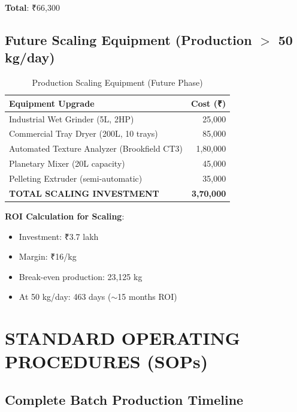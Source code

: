 \documentclass[12pt,a4paper]{article}
\begin{document}
\textbf{Total}: ₹66,300

\subsection{Future Scaling Equipment (Production $>$ 50 kg/day)}

\begin{table}[h]
\centering
\begin{tabular}{lr}
\toprule
\textbf{Equipment Upgrade} & \textbf{Cost (₹)} \\
\midrule
Industrial Wet Grinder (5L, 2HP) & 25,000 \\
Commercial Tray Dryer (200L, 10 trays) & 85,000 \\
Automated Texture Analyzer (Brookfield CT3) & 1,80,000 \\
Planetary Mixer (20L capacity) & 45,000 \\
Pelleting Extruder (semi-automatic) & 35,000 \\
\midrule
\textbf{TOTAL SCALING INVESTMENT} & \textbf{3,70,000} \\
\bottomrule
\end{tabular}
\caption{Production Scaling Equipment (Future Phase)}
\end{table}

\textbf{ROI Calculation for Scaling}:
\begin{itemize}
    \item Investment: ₹3.7 lakh
    \item Margin: ₹16/kg
    \item Break-even production: 23,125 kg
    \item At 50 kg/day: 463 days ($\sim$15 months ROI)
\end{itemize}

\newpage

\section{STANDARD OPERATING PROCEDURES (SOPs)}

\subsection{Complete Batch Production Timeline}
\end{document}
